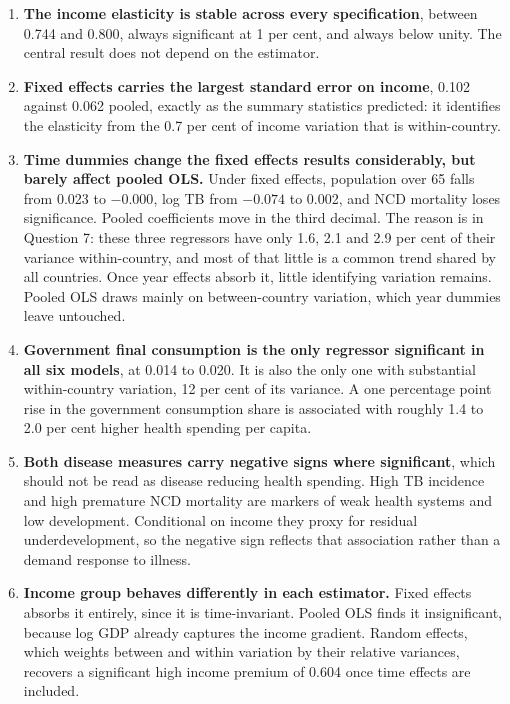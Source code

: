 \documentclass[11pt,a4paper]{article}
\begin{document}
\begin{enumerate}
  \item \textbf{The income elasticity is stable across every specification},
        between 0.744 and 0.800, always significant at 1 per cent, and always
        below unity. The central result does not depend on the estimator.

  \item \textbf{Fixed effects carries the largest standard error on income},
        0.102 against 0.062 pooled, exactly as the summary statistics predicted:
        it identifies the elasticity from the 0.7 per cent of income variation
        that is within-country.

  \item \textbf{Time dummies change the fixed effects results considerably,
        but barely affect pooled OLS.} Under fixed effects, population over 65 falls from
        0.023 to $-0.000$, log TB from $-0.074$ to 0.002, and NCD mortality
        loses significance. Pooled coefficients move in the third decimal. The
        reason is in Question 7: these three regressors have only 1.6, 2.1 and
        2.9 per cent of their variance within-country, and most of that little
        is a common trend shared by all countries. Once year effects absorb it,
        little identifying variation remains. Pooled OLS draws mainly on
        between-country variation, which year dummies leave untouched.

  \item \textbf{Government final consumption is the only regressor significant
        in all six models}, at 0.014 to 0.020. It is also the only one with
        substantial within-country variation, 12 per cent of its variance. A one
        percentage point rise in the government consumption share is associated
        with roughly 1.4 to 2.0 per cent higher health spending per capita.

  \item \textbf{Both disease measures carry negative signs where significant},
        which should not be read as disease reducing health spending. High TB
        incidence and high premature NCD mortality are markers of weak health
        systems and low development. Conditional on income they proxy for
        residual underdevelopment, so the negative sign reflects that
        association rather than a demand response to illness.

  \item \textbf{Income group behaves differently in each estimator.} Fixed
        effects absorbs it entirely, since it is time-invariant. Pooled OLS
        finds it insignificant, because log GDP already captures the income
        gradient. Random effects, which weights between and within variation by
        their relative variances, recovers a significant high income premium of
        0.604 once time effects are included.
\end{enumerate}
\end{document}
